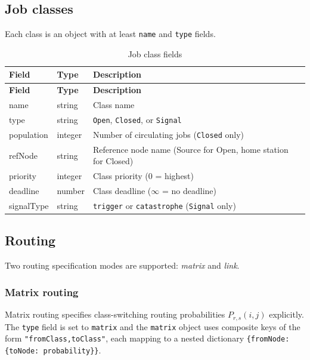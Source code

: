 \subsection{Job classes}
\label{json:classes}

Each class is an object with at least \texttt{name} and \texttt{type} fields.

\begin{footnotesize}
\begin{longtable}{|T{2.2cm}|T{2.5cm}|D{8.2cm}|}
\caption{Job class fields}\label{tab:json-classes}
\\\hline
\textbf{Field} & \textbf{Type} & \textbf{Description} \\\hline
\endfirsthead
\hline \textbf{Field} & \textbf{Type} & \textbf{Description} \\\hline
\endhead
\hline
\endfoot
name       & string & Class name \\\hline
type       & string & \texttt{Open}, \texttt{Closed}, or \texttt{Signal} \\\hline
population & integer & Number of circulating jobs (\texttt{Closed} only) \\\hline
refNode    & string & Reference node name (Source for Open, home station for Closed) \\\hline
priority   & integer & Class priority (0 = highest) \\\hline
deadline   & number & Class deadline ($\infty$ = no deadline) \\\hline
signalType & string & \texttt{trigger} or \texttt{catastrophe} (\texttt{Signal} only) \\\hline
\end{longtable}
\end{footnotesize}

\subsection{Routing}
\label{json:routing}

Two routing specification modes are supported: \emph{matrix} and \emph{link}.

\subsubsection{Matrix routing}
\label{json:routing-matrix}

Matrix routing specifies class-switching routing probabilities $P_{r,s}(i,j)$ explicitly. The \texttt{type} field is set to \texttt{matrix} and the \texttt{matrix} object uses composite keys of the form \texttt{"fromClass,toClass"}, each mapping to a nested dictionary \texttt{\{fromNode: \{toNode: probability\}\}}.

